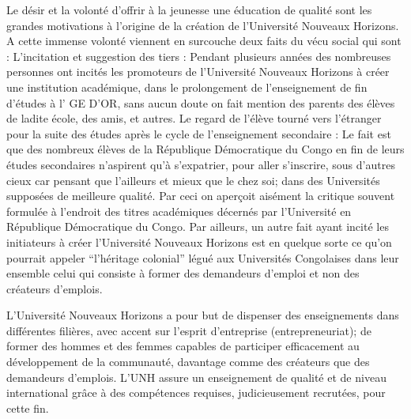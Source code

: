 Le désir et la volonté d’offrir à la jeunesse une éducation de qualité sont les grandes motivations à l'origine de la création de l'Université Nouveaux Horizons. A cette immense volonté viennent en surcouche deux faits du vécu social qui sont : 
L'incitation et suggestion des tiers : 
Pendant plusieurs années des nombreuses personnes ont incités les promoteurs de l’Université Nouveaux Horizons à  créer une institution académique, dans le prolongement de l’enseignement de fin d’études  à l' GE D’OR, sans aucun doute on fait mention des parents des élèves de ladite école, des amis, et autres. 
Le regard de l’élève tourné vers l’étranger pour la suite des études après le cycle de l’enseignement secondaire : 
Le fait est que des nombreux élèves de la République Démocratique du Congo en fin de leurs études secondaires n’aspirent qu'à s'expatrier, pour aller s'inscrire, sous d’autres cieux car pensant que l’ailleurs et mieux que le chez soi; dans des Universités supposées de meilleure qualité. Par ceci on aperçoit aisément la critique souvent formulée à l’endroit des titres académiques décernés par l'Université en République Démocratique du Congo.
Par ailleurs, un autre fait ayant incité les initiateurs à créer l'Université Nouveaux Horizons est en quelque sorte ce qu’on pourrait appeler “l'héritage colonial” légué aux Universités Congolaises dans leur ensemble celui qui consiste à former des demandeurs d’emploi et non des créateurs d’emplois.

L'Université Nouveaux Horizons a pour but de dispenser des enseignements dans différentes filières, avec accent sur l'esprit d'entreprise (entrepreneuriat); de former des hommes et des femmes capables de participer efficacement au développement de la communauté, davantage comme des créateurs que des demandeurs d'emplois.
L'UNH assure un enseignement de qualité et de niveau international grâce à des compétences requises, judicieusement recrutées, pour cette fin.
